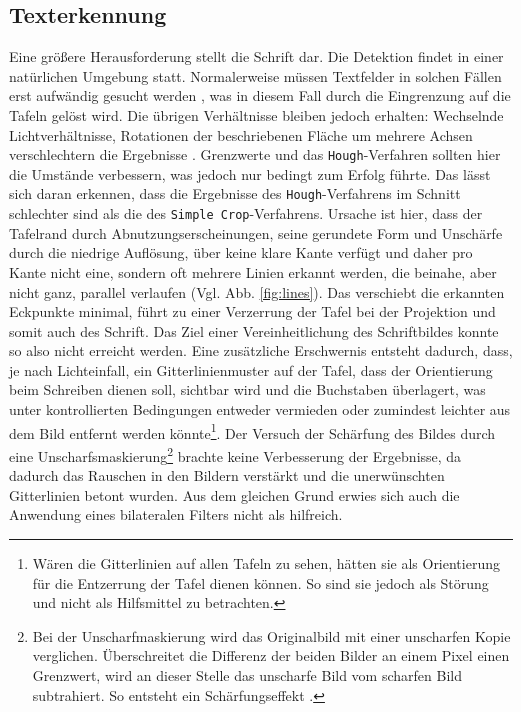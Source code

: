 \subsection{Texterkennung}
\label{section:diskussiontexterkennung}
Eine größere Herausforderung stellt die Schrift dar.
Die Detektion findet in einer natürlichen Umgebung statt. Normalerweise müssen Textfelder in solchen Fällen erst aufwändig gesucht werden \cite{qixiangye}, was in diesem Fall durch die Eingrenzung auf die Tafeln gelöst wird. Die übrigen Verhältnisse bleiben jedoch erhalten: Wechselnde Lichtverhältnisse, Rotationen der beschriebenen Fläche um mehrere Achsen verschlechtern die Ergebnisse \cite{xilinchen} \cite{tesseractoptimum}. Grenzwerte und das \verb|Hough|-Verfahren sollten hier die Umstände verbessern, was jedoch nur bedingt zum Erfolg führte. Das lässt sich daran erkennen, dass die Ergebnisse des \verb|Hough|-Verfahrens im Schnitt schlechter sind als die des \verb|Simple Crop|-Verfahrens. Ursache ist hier, dass der Tafelrand durch Abnutzungserscheinungen, seine gerundete Form und Unschärfe durch die niedrige Auflösung, über keine klare Kante verfügt und daher pro Kante nicht eine, sondern oft mehrere Linien erkannt werden, die beinahe, aber nicht ganz, parallel verlaufen (Vgl. Abb. \ref{fig:lines}). Das verschiebt die erkannten Eckpunkte minimal, führt zu einer Verzerrung der Tafel bei der Projektion und somit auch des Schrift. Das Ziel einer Vereinheitlichung des Schriftbildes konnte so also nicht erreicht werden. Eine zusätzliche Erschwernis entsteht dadurch, dass, je nach Lichteinfall, ein Gitterlinienmuster auf der Tafel, dass der Orientierung beim Schreiben dienen soll, sichtbar wird und die Buchstaben überlagert, was unter kontrollierten Bedingungen entweder vermieden oder zumindest leichter aus dem Bild entfernt werden könnte\footnote{Wären die Gitterlinien auf allen Tafeln zu sehen, hätten sie als Orientierung für die Entzerrung der Tafel dienen können. So sind sie jedoch als Störung und nicht als Hilfsmittel zu betrachten.}.
Der Versuch der Schärfung des Bildes durch eine Unscharfsmaskierung\footnote{Bei der Unscharfmaskierung wird das Originalbild mit einer unscharfen Kopie verglichen. Überschreitet die Differenz der beiden Bilder an einem Pixel einen Grenzwert, wird an dieser Stelle das unscharfe Bild vom scharfen Bild subtrahiert. So entsteht ein Schärfungseffekt \cite{gimpsharpening}.} brachte keine Verbesserung der Ergebnisse, da dadurch das Rauschen in den Bildern verstärkt und die unerwünschten Gitterlinien betont wurden. Aus dem gleichen Grund erwies sich auch die Anwendung eines bilateralen Filters \cite{tomasi} nicht als hilfreich.
